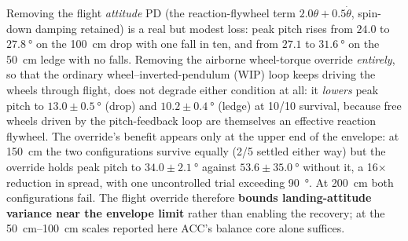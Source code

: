 \documentclass[conference]{IEEEtran}
\begin{document}
Removing the flight \emph{attitude} PD (the reaction-flywheel term
$2.0\theta + 0.5\dot\theta$, spin-down damping retained) is a real but modest
loss: peak pitch rises from $24.0$ to $\SI{27.8}{\degree}$ on the \SI{100}{cm}
drop with one fall in ten, and from $27.1$ to $\SI{31.6}{\degree}$ on the
\SI{50}{cm} ledge with no falls. Removing the airborne wheel-torque override \emph{entirely}, so that the ordinary wheel--inverted-pendulum (WIP) loop keeps driving the wheels through flight, does not degrade either condition at all: it
\emph{lowers} peak pitch to $13.0{\pm}\SI{0.5}{\degree}$ (drop) and
$10.2{\pm}\SI{0.4}{\degree}$ (ledge) at 10/10 survival, because free wheels
driven by the pitch-feedback loop are themselves an effective reaction flywheel.
The override's benefit appears only at the upper end of the envelope: at
\SI{150}{cm} the two configurations survive equally (2/5 settled either way) but
the override holds peak pitch to $34.0{\pm}\SI{2.1}{\degree}$ against
$53.6{\pm}\SI{35.0}{\degree}$ without it, a \num{16}$\times$ reduction in
spread, with one uncontrolled trial exceeding \SI{90}{\degree}. At \SI{200}{cm}
both configurations fail. The flight override therefore \textbf{bounds
landing-attitude variance near the envelope limit} rather than enabling the
recovery; at the \SIrange{50}{100}{cm} scales reported here ACC's balance core
alone suffices.
\end{document}
